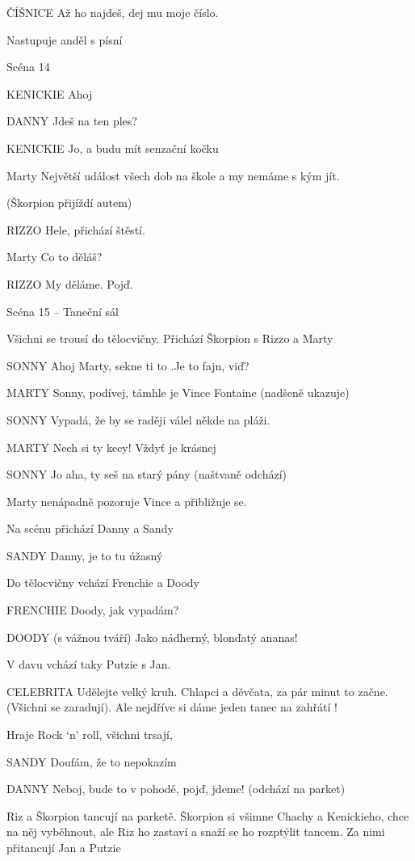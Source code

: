 ČÍŠNICE         Až ho najdeš, dej mu moje číslo. 

Nastupuje anděl s písní 

Scéna 14 

KENICKIE                 Ahoj

DANNY        Jdeš na ten ples?

KENICKIE        Jo, a budu mít senzační kočku

Marty        Největší událost všech dob na škole a my nemáme s kým jít.

(Škorpion přijíždí autem)

RIZZO        Hele, přichází štěstí.

Marty        Co to děláš?

RIZZO        My děláme. Pojď.

Scéna 15 – Taneční sál 

Všichni se trousí do tělocvičny. Přichází Škorpion s Rizzo a Marty

SONNY        Ahoj Marty, sekne ti to .Je to fajn, viď? 

MARTY        Sonny, podívej, támhle je Vince Fontaine (nadšeně ukazuje) 

SONNY        Vypadá, že by se raději válel někde na pláži. 

MARTY        Nech si ty kecy! Vždyť je krásnej 

SONNY        Jo aha, ty seš na starý pány (naštvaně odchází) 

Marty nenápadně pozoruje Vince a přibližuje se. 

Na scénu přichází Danny a Sandy 

SANDY        Danny, je to tu úžasný

Do tělocvičny vchází Frenchie a Doody

FRENCHIE        Doody, jak vypadám? 

DOODY        (s vážnou tváří) Jako nádherný, blonďatý ananas! 

V davu vchází taky Putzie s Jan. 

CELEBRITA         Udělejte velký kruh. Chlapci a děvčata, za pár minut to začne.         (Všichni se zaradují). Ale nejdříve si dáme jeden tanec na zahřátí ! 

Hraje Rock ‘n’ roll, všichni trsají,

SANDY        Doufám, že to nepokazím 

DANNY        Neboj, bude to v pohodě, pojď, jdeme! (odchází na parket)

        Riz a Škorpion tancují na parketě. Škorpion si všimne Chachy a Kenickieho, chce na něj vyběhnout, ale Riz ho zastaví a snaží se ho rozptýlit tancem. Za nimi přitancují Jan a Putzie


